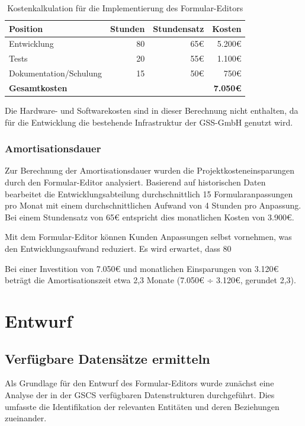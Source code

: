 \documentclass[a4paper,11pt]{article}
\begin{document}
\begin{table}[h]
\centering
\begin{tabular}{lrrr}
\toprule
\textbf{Position} & \textbf{Stunden} & \textbf{Stundensatz} & \textbf{Kosten} \\
\midrule
Entwicklung & 80 & 65€ & 5.200€ \\
Tests & 20 & 55€ & 1.100€ \\
Dokumentation/Schulung & 15 & 50€ & 750€ \\
\midrule
\textbf{Gesamtkosten} & & & \textbf{7.050€} \\
\bottomrule
\end{tabular}
\caption{Kostenkalkulation für die Implementierung des Formular-Editors}
\end{table}

Die Hardware- und Softwarekosten sind in dieser Berechnung nicht enthalten, da für die Entwicklung die bestehende Infrastruktur der GSS-GmbH genutzt wird.

\subsubsection{Amortisationsdauer}
Zur Berechnung der Amortisationsdauer wurden die Projektkosteneinsparungen durch den Formular-Editor analysiert. Basierend auf historischen Daten bearbeitet die Entwicklungsabteilung durchschnittlich 15 Formularanpassungen pro Monat mit einem durchschnittlichen Aufwand von 4 Stunden pro Anpassung. Bei einem Stundensatz von 65€ entspricht dies monatlichen Kosten von 3.900€.

Mit dem Formular-Editor können Kunden Anpassungen selbst vornehmen, was den Entwicklungsaufwand reduziert. Es wird erwartet, dass 80%

Bei einer Investition von 7.050€ und monatlichen Einsparungen von 3.120€ beträgt die Amortisationszeit etwa 2,3 Monate (7.050€ ÷ 3.120€, gerundet 2,3).

\section{Entwurf}
\subsection{Verfügbare Datensätze ermitteln}
Als Grundlage für den Entwurf des Formular-Editors wurde zunächst eine Analyse der in der GSCS verfügbaren Datenstrukturen durchgeführt. Dies umfasste die Identifikation der relevanten Entitäten und deren Beziehungen zueinander.
\end{document}
